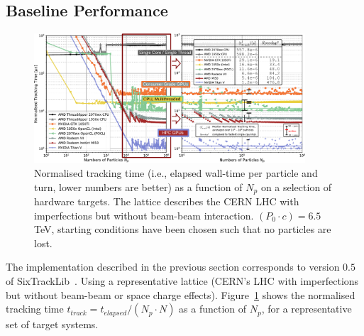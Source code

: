 \documentclass[a4paper,
               refpage,       %
               keeplastbox,   %
               ]{jacow}
\begin{document}
\subsection{Baseline Performance}
\begin{figure}[h!t]
    \centering
    \includegraphics*[width=0.9\textwidth]{fig_performance_baseline}
    \caption{Normalised tracking time (i.e., elapsed wall-time per particle and turn, lower numbers are better) as a function of $N_{p}$ on a selection of hardware targets. The lattice describes the CERN LHC with imperfections but without beam-beam interaction. $(P_0\cdot c) = 6.5$ TeV, starting conditions have been chosen such that no particles are lost.}
    \label{fig:baseline_performance}
\end{figure}
The implementation described in the previous section corresponds to version $0.5$ of SixTrackLib~\cite{sixtracklib-repo-2021}. Using a representative lattice (CERN's LHC with imperfections but without beam-beam or space charge effects). Figure~\ref{fig:baseline_performance} shows the normalised tracking time $t_{track} = t_{elapsed}/(N_{p}\cdot N)$ as a function of $N_{p}$,  for a representative set of target systems. 
\end{document}
